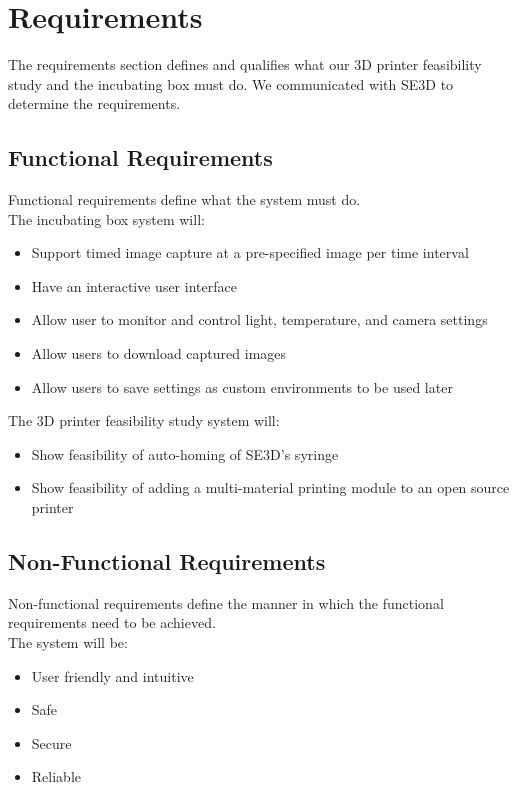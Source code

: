 \chapter{Requirements}

The requirements section defines and qualifies what our 3D printer feasibility study and the incubating box must do. We communicated with SE3D to determine the requirements.

\section{Functional Requirements}

Functional requirements define what the system must do. \\
The incubating box system will:
\begin{itemize}
	\item Support timed image capture at a pre-specified image per time interval
	\item Have an interactive user interface
	\item Allow user to monitor and control light, temperature, and camera settings
	\item Allow users to download captured images
	\item Allow users to save settings as custom environments to be used later
\end{itemize}



The 3D printer feasibility study system will:
\begin{itemize}
	\item Show feasibility of auto-homing of SE3D's syringe 
	\item Show feasibility of adding a multi-material printing module to an open source printer
\end{itemize}



\section{Non-Functional Requirements}
Non-functional requirements define the manner in which the functional requirements need to be achieved. \\
The system will be:
\begin{itemize}
	\item User friendly and intuitive
	\item Safe
	\item Secure
	\item Reliable
\end{itemize} 

